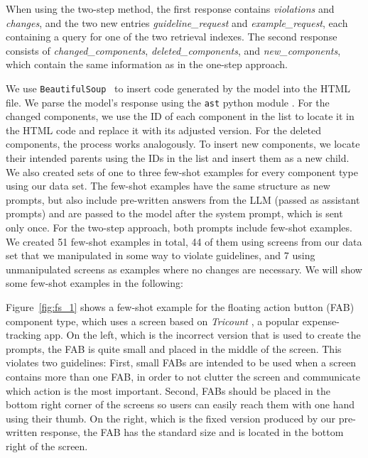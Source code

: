 \documentclass[11pt,titlepage,oneside,openany]{book}
\begin{document}
When using the two-step method, the first response contains \emph{violations} and \emph{changes}, and the two new entries \emph{guideline\_request} and \emph{example\_request}, each containing a query for one of the two retrieval indexes. The second response consists of \emph{changed\_components}, \emph{deleted\_components}, and \emph{new\_components}, which contain the same information as in the one-step approach.

We use \texttt{BeautifulSoup}~\cite{noauthor_beautiful_nodate-1} to insert code generated by the model into the HTML file. We parse the model's response using the \texttt{ast} python module \cite{noauthor_ast_nodate}. For the changed components, we use the ID of each component in the list to locate it in the HTML code and replace it with its adjusted version. For the deleted components, the process works analogously. To insert new components, we locate their intended parents using the IDs in the list and insert them as a new child. We also created sets of one to three few-shot examples for every component type using our data set. The few-shot examples have the same structure as new prompts, but also include pre-written answers from the LLM (passed as assistant prompts) and are passed to the model after the system prompt, which is sent only once. For the two-step approach, both prompts include few-shot examples. We created 51 few-shot examples in total, 44 of them using screens from our data set that we manipulated in some way to violate guidelines, and 7 using unmanipulated screens as examples where no changes are necessary. We will show some few-shot examples in the following: 

Figure~\ref{fig:fs_1} shows a few-shot example for the floating action button (FAB) component type, which uses a screen based on \emph{Tricount} \cite{noauthor_tricount_nodate}, a popular expense-tracking app. On the left, which is the incorrect version that is used to create the prompts, the FAB is quite small and placed in the middle of the screen. This violates two guidelines: First, small FABs are intended to be used when a screen contains more than one FAB, in order to not clutter the screen and communicate which action is the most important. Second, FABs should be placed in the bottom right corner of the screens so users can easily reach them with one hand using their thumb. On the right, which is the fixed version produced by our pre-written response, the FAB has the standard size and is located in the bottom right of the screen. 
\end{document}
